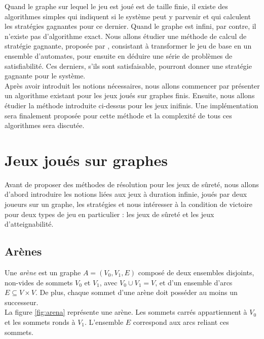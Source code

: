 \documentclass[12pt,a4paper,oneside,titlepage]{report}
\begin{document}
\noindent Quand le graphe sur lequel le jeu est joué est de taille finie, il existe des algorithmes simples qui indiquent si le système peut y parvenir et qui calculent les stratégies gagnantes pour ce dernier. Quand le graphe est infini, par contre, il n'existe pas d'algorithme exact. Nous allons étudier une méthode de calcul de stratégie gagnante, proposée par \cite{NeiderAutomaton}, consistant à transformer le jeu de base en un ensemble d'automates, pour ensuite en déduire une série de problèmes de satisfiabilité. Ces derniers, s'ils sont satisfaisable, pourront donner une stratégie gagnante pour le système.\\

\noindent Après avoir introduit les notions nécessaires, nous allons commencer par présenter un algorithme existant pour les jeux joués sur graphes finis. Ensuite, nous allons étudier la méthode introduite ci-dessus pour les jeux inifinis. Une implémentation sera finalement proposée pour cette méthode et la complexité de tous ces algorithmes sera discutée.
\newpage

\chapter{Jeux joués sur graphes}\label{ch:1}
\renewcommand{\leftmark}{CHAPITRE \thechapter.~~Jeux joués sur graphes}
Avant de proposer des méthodes de résolution pour les jeux de sûreté, nous allons d'abord introduire les notions liées aux jeux à duration infinie, joués par deux joueurs sur un graphe, les stratégies et nous intéresser à la condition de victoire pour deux types de jeu en particulier : les jeux de sûreté et les jeux d'atteignabilité. 
\section{Arènes}
Une \emph{arène} est un graphe $A = (V_0,V_1,E)$ composé de deux ensembles disjoints, non-vides de sommets $V_0$ et $V_1$, avec $V_0 \cup V_1 = V$, et d'un ensemble d'arcs $E \subseteq V\times V$. De plus, chaque sommet d'une arène doit posséder au moins un successeur.\\

\noindent La figure \ref{fig:arena} représente une arène. Les sommets carrés appartiennent à $V_0$ et les sommets ronds à $V_1$. L'ensemble $E$ correspond aux arcs reliant ces sommets.
\end{document}

